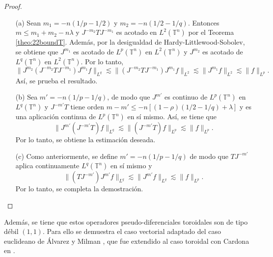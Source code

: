 \begin{proof}
	\begin{itemize}
		\item[(a)] Sean $m_1 = -n(1/p - 1/2)$ y $m_2=-n(1/2 - 1/q)$. Entonces $m\leq m_1+m_2-n\lambda$ y $J^{-m_2}TJ^{-m_1}$ es acotado en $L^2(\mathbb{T}^n)$ por el Teorema \ref{theo:22boundT}. Además, por la desigualdad de Hardy-Littlewood-Sobolev, se obtiene que $J^{m_1}$ es acotado de $L^p(\mathbb{T}^n)$ en $L^2(\mathbb{T}^n)$ y $J^{m_2}$ es acotado de $L^q(\mathbb{T}^n)$ en $L^2(\mathbb{T}^n)$. Por lo tanto, 
		\begin{equation*}
			\| J^{m_2}(J^{-m_2}TJ^{-m_1})J^{m_1}f \|_{L^q} \lesssim \|(J^{-m_2}TJ^{-m_1})J^{m_1}f  \|_{L^2} \lesssim \| J^{m_1}f \|_{L^2} \lesssim  \| f\|_{L^p}.
		\end{equation*}
		Así, se prueba el resultado.
		\item[(b)] Sea $m' = -n(1/p - 1/q)$, de modo que $J^{m'}$ es continuo de  $L^p(\mathbb{T}^n)$ en $L^q(\mathbb{T}^n)$ y $J^{-m'}T$ tiene orden $m-m' \leq -n[(1-\rho)(1/2 - 1/q) + \lambda]$ y es una aplicación continua de $L^p(\mathbb{T}^n)$ en sí mismo. Así, se tiene que
		\begin{equation*}
			\| J^{m'}(J^{-m'}T)f \|_{L^q} \lesssim \|(J^{-m'}T)f\|_{L^p} \lesssim \|f\|_{L^p}.
		\end{equation*}
		Por lo tanto, se obtiene la estimación deseada.

		\item[(c)] Como anteriormente, se define  $m' = -n(1/p - 1/q)$ de modo que $TJ^{-m'}$ aplica continuamente  $L^q(\mathbb{T}^n)$ en sí mismo y
		\begin{equation*}
			\|(TJ^{-m'})J^{m'}f\|_{L^q} \lesssim \|J^{m'}f\|_{L^q} \lesssim \|f\|_{L^p}.
		\end{equation*}
		Por lo tanto, se completa la demostración.
	\end{itemize}
\end{proof}
Además, se tiene que estos operadores pseudo-diferenciales toroidales son de tipo débil $(1,1)$. Para ello se demuestra el caso vectorial adaptado del caso euclideano de Álvarez y Milman \cite{alvarez-milman}, que fue extendido al caso toroidal con Cardona en \cite{Cardona:Martinez}.
